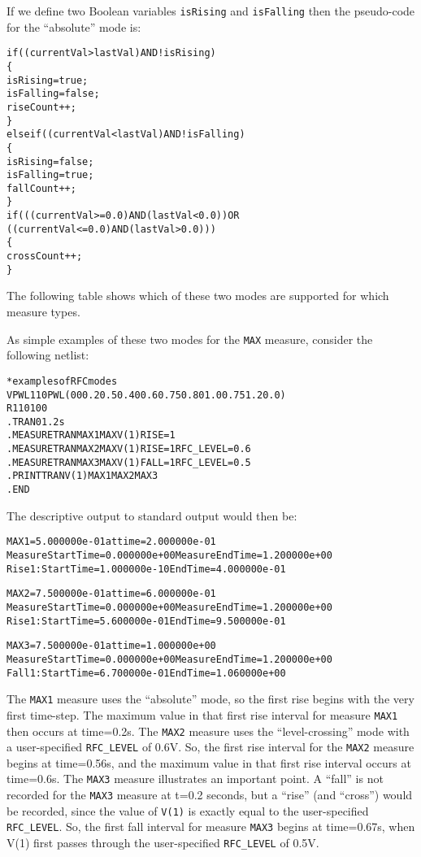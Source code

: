 If we define two Boolean variables \texttt{isRising} and \texttt{isFalling} then
the pseudo-code for the ``absolute'' mode is:
\begin{alltt}
if( (currentVal > lastVal) AND !isRising )
\{
  isRising= true;
  isFalling = false;
  riseCount++;
\}
else if( (currentVal < lastVal) AND !isFalling )
\{
  isRising = false;
  isFalling = true;
  fallCount++;
\}
if ( ( (currentVal >= 0.0) AND (lastVal < 0.0) ) OR
     ( (currentVal <= 0.0) AND (lastVal > 0.0) ) )
\{
  crossCount++;
\}
\end{alltt}
The following table shows which of these two modes are supported for which
\Xyce{} measure types.

As simple examples of these two modes for the \texttt{MAX} measure, consider
the following netlist:
\begin{alltt}
*examples of RFC modes
VPWL1  1  0 PWL(0 0 0.2 0.5 0.4 0 0.6 0.75 0.8 0 1.0 0.75 1.2 0.0)
R1  1  0  100
.TRAN 0 1.2s
.MEASURE TRAN MAX1 MAX V(1) RISE=1
.MEASURE TRAN MAX2 MAX V(1) RISE=1 RFC_LEVEL=0.6
.MEASURE TRAN MAX3 MAX V(1) FALL=1 RFC_LEVEL=0.5
.PRINT TRAN V(1) MAX1 MAX2 MAX3
.END
\end{alltt}
The descriptive output to standard output would then be:
\begin{alltt}
MAX1 = 5.000000e-01 at time = 2.000000e-01
Measure Start Time= 0.000000e+00        Measure End Time= 1.200000e+00
Rise 1: Start Time= 1.000000e-10        End Time= 4.000000e-01

MAX2 = 7.500000e-01 at time = 6.000000e-01
Measure Start Time= 0.000000e+00        Measure End Time= 1.200000e+00
Rise 1: Start Time= 5.600000e-01        End Time= 9.500000e-01

MAX3 = 7.500000e-01 at time = 1.000000e+00
Measure Start Time= 0.000000e+00        Measure End Time= 1.200000e+00
Fall 1: Start Time= 6.700000e-01        End Time= 1.060000e+00
\end{alltt}
The \texttt{MAX1} measure uses the ``absolute'' mode, so the first
rise begins with the very first time-step.  The maximum value in that
first rise interval for measure \texttt{MAX1} then occurs at
time=0.2s.  The \texttt{MAX2} measure uses the ``level-crossing'' mode
with a user-specified \texttt{RFC\_LEVEL} of 0.6V.  So, the first rise
interval for the \texttt{MAX2} measure begins at time=0.56s, and the
maximum value in that first rise interval occurs at time=0.6s.  The
\texttt{MAX3} measure illustrates an important point.  A ``fall'' is not
recorded for the \texttt{MAX3} measure at t=0.2 seconds, but a
``rise'' (and ``cross'') would be recorded, since the value
of \texttt{V(1)} is exactly equal to the
user-specified \texttt{RFC\_LEVEL}. So, the first fall interval for
measure
\texttt{MAX3} begins at time=0.67s, when V(1) first passes through the
user-specified \texttt{RFC\_LEVEL} of 0.5V.

